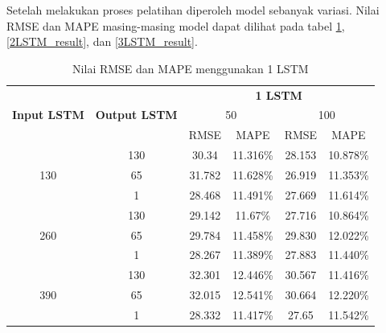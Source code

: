 \documentclass[conference]{IEEEtran}
\begin{document}
Setelah melakukan proses pelatihan diperoleh model sebanyak variasi. Nilai RMSE dan MAPE masing-masing model dapat dilihat pada tabel \ref{1LSTM_result}, \ref{2LSTM_result}, dan \ref{3LSTM_result}.
\begin{table}[htp]
\centering
\begin{tabular}{|c|c|c|c|c|c|}
	\hline 
	\multirow{3}{*}{\textbf{Input LSTM}} & \multirow{3}{*}{\textbf{Output LSTM}} & \multicolumn{4}{c|}{\textbf{1 LSTM}} \\ \cline{3-6}
	&  & \multicolumn{2}{c|}{50}& \multicolumn{2}{c|}{100} \\ \cline{3-6}
	& & RMSE & MAPE& RMSE & MAPE\\
	\hline
	\multirow{3}{*}{130} & 130 & 30.34& 11.316\%& 28.153 & 10.878\%\\
	& 65 & 31.782 & 11.628\% & 26.919 & 11.353\% \\
	& 1 & 28.468 & 11.491\% & 27.669 & 11.614\% \\
	\hline
	\multirow{3}{*}{260} & 130 & 29.142 & 11.67\%  & 27.716 & 10.864\%\\
	& 65 & 29.784 & 11.458\% & 29.830 & 12.022\%\\
	& 1 & 28.267 & 11.389\% & 27.883 & 11.440\% \\
	\hline
	\multirow{3}{*}{390} & 130 & 32.301 & 12.446\% & 30.567 & 11.416\% \\
	& 65 & 32.015 & 12.541\% & 30.664 & 12.220\% \\
	& 1 & 28.332 & 11.417\% & 27.65 & 11.542\% \\
	\hline
\end{tabular}
\caption{Nilai RMSE dan MAPE menggunakan 1 LSTM}
\label{1LSTM_result}
\end{table} 
\end{document}
